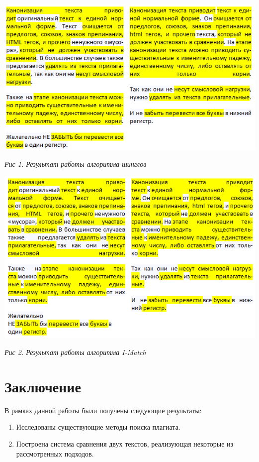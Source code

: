 \documentclass[a4paper,12pt,oneside]{article}
\begin{document}
\includegraphics{a.png} 
\begin{center}
\textit{Рис 1. Результат работы алгоритма шинглов}
\end{center}

\includegraphics{b.png} 
\begin{center}
\textit{Рис 2. Результат работы алгоритма I-Match}
\end{center}

\newpage
\section{Заключение}
В рамках данной работы были получены следующие результаты:
\begin{enumerate}
\item Исследованы существующие методы поиска плагиата.
\item Построена система сравнения двух текстов, реализующая некоторые из рассмотренных подходов.
\end{enumerate}
\end{document}
